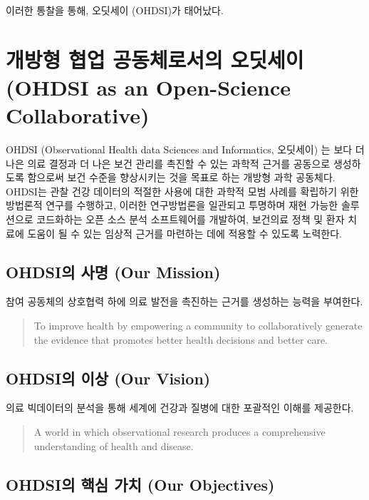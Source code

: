 \documentclass[11pt]{book}
\theoremstyle{definition}
\theoremstyle{definition}
\theoremstyle{definition}
\theoremstyle{remark}
\begin{document}
이러한 통찰을 통해, 오딧세이 (OHDSI)가 태어났다.

\section{개방형 협업 공동체로서의 오딧세이 (OHDSI as an Open-Science
Collaborative)}\label{----ohdsi-as-an-open-science-collaborative}

OHDSI (Observational Health data Sciences and Informatics, 오딧세이) 는
보다 더 나은 의료 결정과 더 나은 보건 관리를 촉진할 수 있는 과학적
근거를 공동으로 생성하도록 함으로써 보건 수준을 향상시키는 것을 목표로
하는 개방형 과학 공동체다. \citep{Hripcsak2015} OHDSI는 관찰 건강
데이터의 적절한 사용에 대한 과학적 모범 사례를 확립하기 위한 방법론적
연구를 수행하고, 이러한 연구방법론을 일관되고 투명하며 재현 가능한
솔루션으로 코드화하는 오픈 소스 분석 소프트웨어를 개발하여, 보건의료
정책 및 환자 치료에 도움이 될 수 있는 임상적 근거를 마련하는 데에 적용할
수 있도록 노력한다.

\subsection{OHDSI의 사명 (Our Mission)}\label{ohdsi--our-mission}

참여 공동체의 상호협력 하에 의료 발전을 촉진하는 근거를 생성하는 능력을
부여한다.

\begin{quote}
To improve health by empowering a community to collaboratively generate
the evidence that promotes better health decisions and better care.
\end{quote}

\subsection{OHDSI의 이상 (Our Vision)}\label{ohdsi--our-vision}

의료 빅데이터의 분석을 통해 세계에 건강과 질병에 대한 포괄적인 이해를
제공한다.

\begin{quote}
A world in which observational research produces a comprehensive
understanding of health and disease. 
\end{quote}

\subsection{OHDSI의 핵심 가치 (Our
Objectives)}\label{ohdsi---our-objectives}
\end{document}
